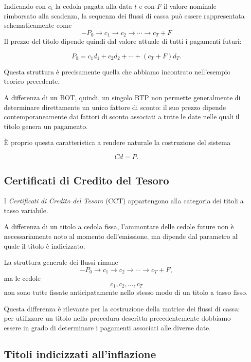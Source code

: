Indicando con $c_t$ la cedola pagata alla data $t$ e con $F$ il
valore nominale rimborsato alla scadenza, la sequenza dei flussi di
cassa può essere rappresentata schematicamente come
$$
-P_0
\longrightarrow
c_1
\longrightarrow
c_2
\longrightarrow
\cdots
\longrightarrow
c_T+F
$$
Il prezzo del titolo dipende quindi dal valore attuale di tutti i
pagamenti futuri:

\begin{equation*}
    P_0
    =
    c_1d_1+c_2d_2+\cdots+(c_T+F)d_T.
    \label{eq:btp-price}
\end{equation*}

Questa struttura è precisamente quella che abbiamo incontrato
nell'esempio teorico precedente.

A differenza di un BOT, quindi, un singolo BTP non permette
generalmente di determinare direttamente un unico fattore di sconto:
il suo prezzo dipende contemporaneamente dai fattori di sconto
associati a tutte le date nelle quali il titolo genera un pagamento.

È proprio questa caratteristica a rendere naturale la costruzione
del sistema

\begin{equation*}
    Cd=P.
\end{equation*}


\subsection{Certificati di Credito del Tesoro}

I \emph{Certificati di Credito del Tesoro} (CCT) appartengono alla
categoria dei titoli a tasso variabile.

A differenza di un titolo a cedola fissa, l'ammontare delle cedole
future non è necessariamente noto al momento dell'emissione, ma
dipende dal parametro al quale il titolo è indicizzato.

La struttura generale dei flussi rimane
$$
-P_0
\longrightarrow
c_1
\longrightarrow
c_2
\longrightarrow
\cdots
\longrightarrow
c_T+F,
$$
ma le cedole
$$
    c_1,c_2,\ldots,c_T
$$
non sono tutte fissate anticipatamente nello stesso modo di un
titolo a tasso fisso.

Questa differenza è rilevante per la costruzione della matrice dei
flussi di cassa: per utilizzare un titolo nella procedura descritta
precedentemente dobbiamo essere in grado di determinare i pagamenti
associati alle diverse date.


\subsection{Titoli indicizzati all'inflazione}

